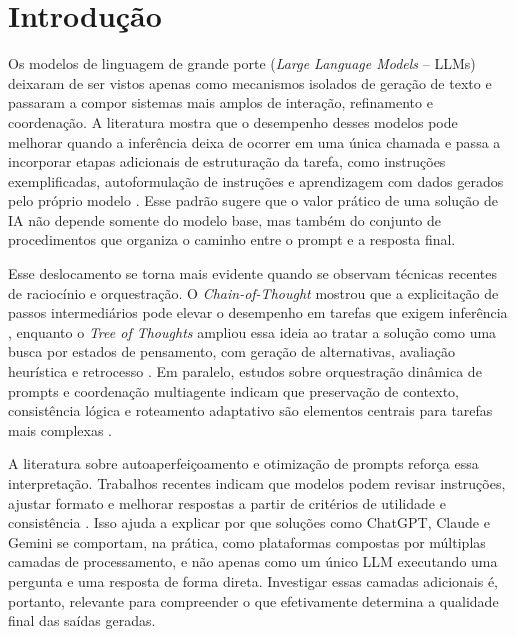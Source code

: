 \documentclass[a4paper,10pt,twocolumn]{article}
\begin{document}
\section{Introdução}

Os modelos de linguagem de grande porte (\textit{Large Language Models} -- LLMs) deixaram de ser vistos apenas como mecanismos isolados de geração de texto e passaram a compor sistemas mais amplos de interação, refinamento e coordenação. A literatura mostra que o desempenho desses modelos pode melhorar quando a inferência deixa de ocorrer em uma única chamada e passa a incorporar etapas adicionais de estruturação da tarefa, como instruções exemplificadas, autoformulação de instruções e aprendizagem com dados gerados pelo próprio modelo \cite{brown2020language,wang2023selfinstruct,huang2023selfimprove}. Esse padrão sugere que o valor prático de uma solução de IA não depende somente do modelo base, mas também do conjunto de procedimentos que organiza o caminho entre o prompt e a resposta final.

Esse deslocamento se torna mais evidente quando se observam técnicas recentes de raciocínio e orquestração. O \textit{Chain-of-Thought} mostrou que a explicitação de passos intermediários pode elevar o desempenho em tarefas que exigem inferência \cite{wei2022chain}, enquanto o \textit{Tree of Thoughts} ampliou essa ideia ao tratar a solução como uma busca por estados de pensamento, com geração de alternativas, avaliação heurística e retrocesso \cite{yao2023tree}. Em paralelo, estudos sobre orquestração dinâmica de prompts e coordenação multiagente indicam que preservação de contexto, consistência lógica e roteamento adaptativo são elementos centrais para tarefas mais complexas \cite{reasoningaware_orchestration}.

A literatura sobre autoaperfeiçoamento e otimização de prompts reforça essa interpretação. Trabalhos recentes indicam que modelos podem revisar instruções, ajustar formato e melhorar respostas a partir de critérios de utilidade e consistência \cite{wang2023selfinstruct,huang2023selfimprove,zhang2024enhancing,liu2025beyond}. Isso ajuda a explicar por que soluções como ChatGPT, Claude e Gemini se comportam, na prática, como plataformas compostas por múltiplas camadas de processamento, e não apenas como um único LLM executando uma pergunta e uma resposta de forma direta. Investigar essas camadas adicionais é, portanto, relevante para compreender o que efetivamente determina a qualidade final das saídas geradas.
\end{document}
